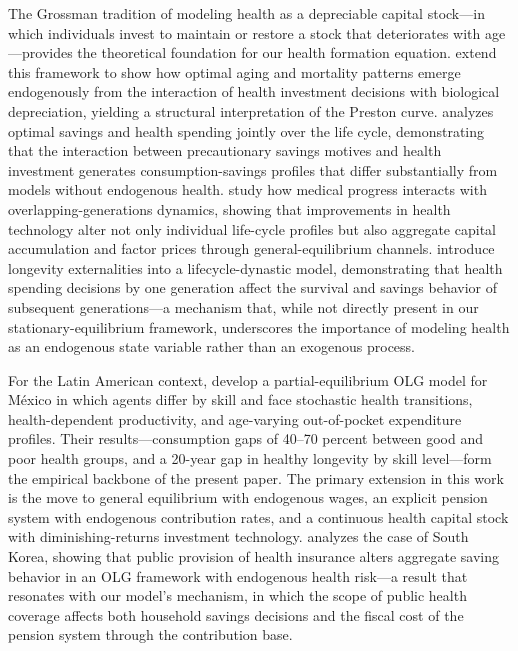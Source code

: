 \documentclass[12pt,a4paper]{article}
\begin{document}
The Grossman tradition of modeling health as a depreciable capital stock---in which individuals invest to maintain or restore a stock that deteriorates with age---provides the theoretical foundation for our health formation equation. \citet{DalgaardStrulik2014} extend this framework to show how optimal aging and mortality patterns emerge endogenously from the interaction of health investment decisions with biological depreciation, yielding a structural interpretation of the Preston curve. \citet{Fioroni2010} analyzes optimal savings and health spending jointly over the life cycle, demonstrating that the interaction between precautionary savings motives and health investment generates consumption-savings profiles that differ substantially from models without endogenous health. \citet{FrankovicWrzaczek2020} study how medical progress interacts with overlapping-generations dynamics, showing that improvements in health technology alter not only individual life-cycle profiles but also aggregate capital accumulation and factor prices through general-equilibrium channels. \citet{YewZhang2018} introduce longevity externalities into a lifecycle-dynastic model, demonstrating that health spending decisions by one generation affect the survival and savings behavior of subsequent generations---a mechanism that, while not directly present in our stationary-equilibrium framework, underscores the importance of modeling health as an endogenous state variable rather than an exogenous process.

For the Latin American context, \citet{CortesEtAl2024} develop a partial-equilibrium OLG model for M\'exico in which agents differ by skill and face stochastic health transitions, health-dependent productivity, and age-varying out-of-pocket expenditure profiles. Their results---consumption gaps of 40--70 percent between good and poor health groups, and a 20-year gap in healthy longevity by skill level---form the empirical backbone of the present paper. The primary extension in this work is the move to general equilibrium with endogenous wages, an explicit pension system with endogenous contribution rates, and a continuous health capital stock with diminishing-returns investment technology. \citet{Lim2020} analyzes the case of South Korea, showing that public provision of health insurance alters aggregate saving behavior in an OLG framework with endogenous health risk---a result that resonates with our model's mechanism, in which the scope of public health coverage affects both household savings decisions and the fiscal cost of the pension system through the contribution base.
\end{document}
